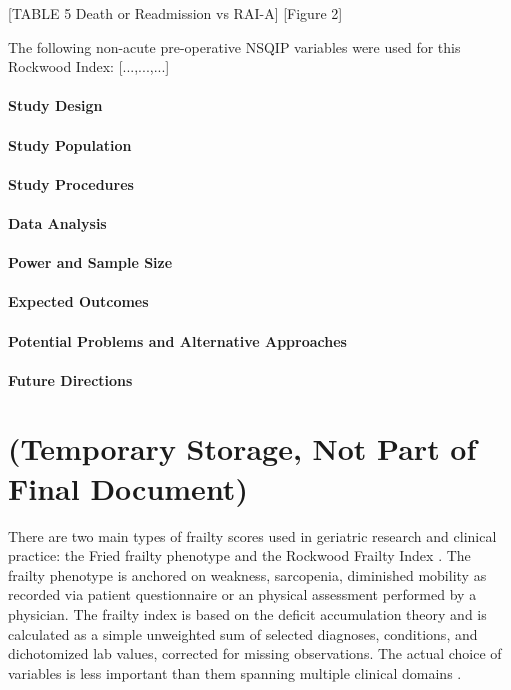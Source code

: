 [TABLE 5 Death or Readmission vs RAI-A] [Figure 2]

The following non-acute pre-operative NSQIP variables were used for this Rockwood Index: [...,...,...]

\paragraph{Study Design}\label{study-design}


\paragraph{Study Population}\label{study-population}


\paragraph{Study Procedures}\label{study-procedures}


\paragraph{Data Analysis}\label{data-analysis}

\paragraph{Power and Sample Size}\label{power-and-sample-size}

\paragraph{Expected Outcomes}\label{expected-outcomes}

\paragraph{Potential Problems and Alternative
      Approaches}\label{potential-problems-and-alternative-approaches}

\paragraph{Future Directions}\label{future-directions} 
    
\section{(Temporary Storage, Not Part of Final Document)}\label{ammo}
There are two main types of frailty scores used in geriatric research and clinical practice: the Fried frailty phenotype \cite{Fried_2001} and the Rockwood Frailty Index \cite{Mitnitski_2001}. The frailty phenotype is anchored on weakness, sarcopenia, diminished mobility as recorded via patient questionnaire or an physical assessment performed by a physician. The frailty index is based on the deficit accumulation theory and is calculated as a simple unweighted sum of selected diagnoses, conditions, and dichotomized lab values, corrected for missing observations. The actual choice of variables is less important than them spanning multiple clinical domains \cite{Searle_2008}. 

